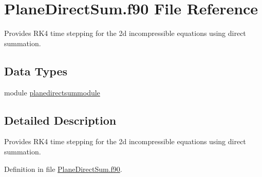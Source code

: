 \hypertarget{_plane_direct_sum_8f90}{\section{Plane\+Direct\+Sum.\+f90 File Reference}
\label{_plane_direct_sum_8f90}
}


Provides R\+K4 time stepping for the 2d incompressible equations using direct summation.  


\subsection*{Data Types}
\begin{DoxyCompactItemize}
\item 
module \hyperlink{classplanedirectsummodule}{planedirectsummodule}
\end{DoxyCompactItemize}


\subsection{Detailed Description}
Provides R\+K4 time stepping for the 2d incompressible equations using direct summation. 



Definition in file \hyperlink{_plane_direct_sum_8f90_source}{Plane\+Direct\+Sum.\+f90}.

